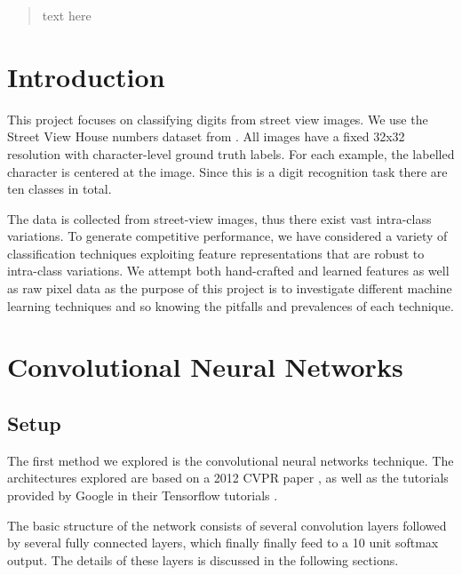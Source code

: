 \documentclass{article} %
\begin{document}
\author{Bai, Min \texttt{mbai@cs.toronto.edu}}
\author{Loyzer, Mark \texttt{loyzer@cs.toronto.edu}}

\newcommand{\fix}{\marginpar{FIX}}
\newcommand{\new}{\marginpar{NEW}}

\nipsfinalcopy %

\begin{abstract}
text here
\end{abstract}

\section{Introduction}
This project focuses on classifying digits from street view images.  We use the Street View House numbers dataset from \cite{svhn}. All images have a fixed 32x32 resolution with character-level ground truth labels. For each example, the labelled character is centered at the image. Since this is a digit recognition task there are ten classes in total.

The data is collected from street-view images, thus there exist vast intra-class variations. To generate competitive performance, we have considered a variety of classification techniques exploiting feature representations that are robust to intra-class variations. We attempt both hand-crafted and learned features as well as raw pixel data as the purpose of this project is to investigate different machine learning techniques and so knowing the pitfalls and prevalences of each technique.

\section{Convolutional Neural Networks}

\subsection{Setup}

The first method we explored is the convolutional neural networks technique. The architectures explored are based on a 2012 CVPR paper \cite{lecun2012}, as well as the tutorials provided by Google in their Tensorflow tutorials \cite{googletensorflow}. 

The basic structure of the network consists of several convolution layers followed by several fully connected layers, which finally finally feed to a 10 unit softmax output. The details of these layers is discussed in the following sections. 
\end{document}
